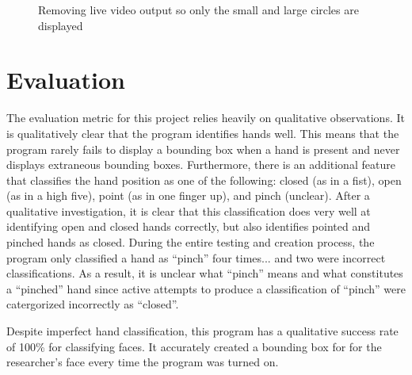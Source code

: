 \documentclass[10pt,twocolumn]{article}
\begin{document}
\begin{figure}[hbh]
\begin{center}
\vspace{.5cm}
\caption{Removing live video output so only the small and large circles are displayed}
\label{fig:large_circle_no_vid}
\end{center}
\end{figure}



\section{Evaluation}
The evaluation metric for this project relies heavily on qualitative observations.  It is qualitatively clear that the program identifies hands well. This means that the program rarely fails to display a bounding box when a hand is present and never displays extraneous bounding boxes.  Furthermore, there is an additional feature that classifies the hand position as one of the following: closed (as in a fist), open (as in a high five), point (as in one finger up), and pinch (unclear).  After a qualitative investigation, it is clear that this classification does very well at identifying open and closed hands correctly, but also identifies pointed and pinched hands as closed.   During the entire testing and creation process, the program only classified a hand as ``pinch'' four times... and two were incorrect classifications. As a result, it is unclear what ``pinch'' means and what constitutes a ``pinched'' hand since active attempts to produce a classification of ``pinch'' were catergorized incorrectly as ``closed''.  

Despite imperfect hand classification, this program has a qualitative success rate of 100\% for classifying faces.  It accurately created a bounding box for for the researcher's face every time the program was turned on. 
\end{document}

